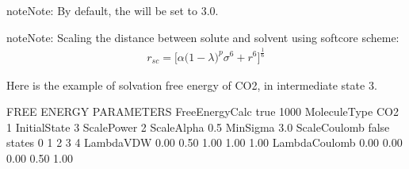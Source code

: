 \documentclass[letterpaper,10pt,english]{sphinxmanual}
\begin{document}
\begin{description}
\begin{description}
\begin{itemize}
\end{itemize}

\begin{sphinxadmonition}{note}{Note:}
\sphinxAtStartPar
By default, the  will be set to 3.0.
\end{sphinxadmonition}

\end{description}

\begin{sphinxadmonition}{note}{Note:}
\sphinxAtStartPar
Scaling the distance between solute and solvent using soft\sphinxhyphen{}core scheme:
\begin{equation*}
\begin{split}r_{sc} = \bigg[\alpha {\big(1 - \lambda \big)}^{p}{\sigma}^6 + {r}^6 \bigg]^{\frac{1}{6}}\end{split}
\end{equation*}\end{sphinxadmonition}

\sphinxAtStartPar
Here is the example of solvation free energy of CO2, in intermediate state 3.

\end{description}

\begin{sphinxVerbatim}[commandchars=\\\{\}]
\PYGZsh{}\PYGZsh{}\PYGZsh{}\PYGZsh{}\PYGZsh{}\PYGZsh{}\PYGZsh{}\PYGZsh{}\PYGZsh{}\PYGZsh{}\PYGZsh{}\PYGZsh{}\PYGZsh{}\PYGZsh{}\PYGZsh{}\PYGZsh{}\PYGZsh{}\PYGZsh{}\PYGZsh{}\PYGZsh{}\PYGZsh{}\PYGZsh{}\PYGZsh{}\PYGZsh{}\PYGZsh{}\PYGZsh{}\PYGZsh{}\PYGZsh{}\PYGZsh{}\PYGZsh{}\PYGZsh{}\PYGZsh{}\PYGZsh{}
\PYGZsh{} FREE ENERGY PARAMETERS
\PYGZsh{}\PYGZsh{}\PYGZsh{}\PYGZsh{}\PYGZsh{}\PYGZsh{}\PYGZsh{}\PYGZsh{}\PYGZsh{}\PYGZsh{}\PYGZsh{}\PYGZsh{}\PYGZsh{}\PYGZsh{}\PYGZsh{}\PYGZsh{}\PYGZsh{}\PYGZsh{}\PYGZsh{}\PYGZsh{}\PYGZsh{}\PYGZsh{}\PYGZsh{}\PYGZsh{}\PYGZsh{}\PYGZsh{}\PYGZsh{}\PYGZsh{}\PYGZsh{}\PYGZsh{}\PYGZsh{}\PYGZsh{}\PYGZsh{}
FreeEnergyCalc true   1000
MoleculeType   CO2   1
InitialState   3
ScalePower     2
ScaleAlpha     0.5
MinSigma       3.0
ScaleCoulomb   false
\PYGZsh{}states        0    1    2    3    4
LambdaVDW      0.00 0.50 1.00 1.00 1.00
LambdaCoulomb  0.00 0.00 0.00 0.50 1.00
\end{sphinxVerbatim}
\end{document}
